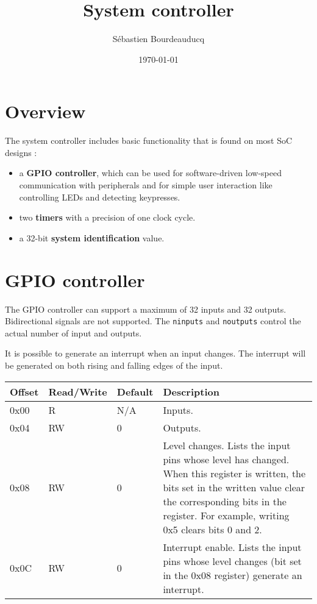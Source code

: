 \documentclass[a4paper,11pt]{article}
\title{System controller}
\author{S\'ebastien Bourdeauducq}
\date{\today}
\begin{document}
\maketitle{}
\section{Overview}

The system controller includes basic functionality that is found on most SoC designs :
\begin{itemize}
\item a \textbf{GPIO controller}, which can be used for software-driven low-speed communication with peripherals and for simple user interaction like controlling LEDs and detecting keypresses.
\item two \textbf{timers} with a precision of one clock cycle.
\item a 32-bit \textbf{system identification} value.
\end{itemize}

\section{GPIO controller}

The GPIO controller can support a maximum of 32 inputs and 32 outputs. Bidirectional signals are not supported. The \verb!ninputs! and \verb!noutputs! control the actual number of input and outputs.

It is possible to generate an interrupt when an input changes. The interrupt will be generated on both rising and falling edges of the input.

\begin{tabular}{|l|l|l|p{8cm}|}
\hline
\bf{Offset} & \bf{Read/Write} & \bf{Default} & \bf{Description} \\
\hline
0x00 & R & N/A & Inputs. \\
\hline
0x04 & RW & 0 & Outputs. \\
\hline
0x08 & RW & 0 & Level changes. Lists the input pins whose level has changed. When this register is written, the bits set in the written value clear the corresponding bits in the register. For example, writing 0x5 clears bits 0 and 2. \\
\hline
0x0C & RW & 0 & Interrupt enable. Lists the input pins whose level changes (bit set in the 0x08 register) generate an interrupt. \\
\hline
\end{tabular}\\
\end{document}
